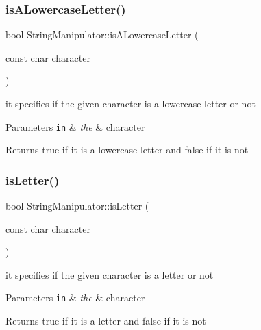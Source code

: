 \subsubsection{\texorpdfstring{is\+A\+Lowercase\+Letter()}{isALowercaseLetter()}}
{\footnotesize\ttfamily bool String\+Manipulator\+::is\+A\+Lowercase\+Letter (\begin{DoxyParamCaption}\item[{const char}]{character }\end{DoxyParamCaption})\hspace{0.3cm}{\ttfamily [static]}}

it specifies if the given character is a lowercase letter or not


\begin{DoxyParams}[1]{Parameters}
\mbox{\tt in}  & {\em the} & character\\
\hline
\end{DoxyParams}
\begin{DoxyReturn}{Returns}
true if it is a lowercase letter and false if it is not 
\end{DoxyReturn}
\mbox{\label{class_string_manipulator_a73afb49f8c116036fe2aa8d2e6ac81c1}} 
\subsubsection{\texorpdfstring{is\+Letter()}{isLetter()}}
{\footnotesize\ttfamily bool String\+Manipulator\+::is\+Letter (\begin{DoxyParamCaption}\item[{const char}]{character }\end{DoxyParamCaption})\hspace{0.3cm}{\ttfamily [static]}}

it specifies if the given character is a letter or not


\begin{DoxyParams}[1]{Parameters}
\mbox{\tt in}  & {\em the} & character\\
\hline
\end{DoxyParams}
\begin{DoxyReturn}{Returns}
true if it is a letter and false if it is not 
\end{DoxyReturn}
\mbox{\label{class_string_manipulator_aa59cf4c8d9832ba6cb60e7d1636ea860}} 
